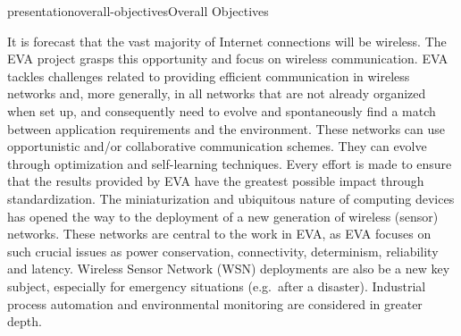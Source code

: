 \documentclass{ra2016}
\begin{document}


%

\begin{module}{presentation}{overall-objectives}{Overall Objectives}

It is forecast that the vast majority of Internet connections will be wireless.
The EVA project grasps this opportunity and focus on wireless communication.
EVA tackles challenges related to providing efficient communication in wireless networks and, more generally, in all networks that are not already organized when set up, and consequently need to evolve and spontaneously find a match between application requirements and the environment.
These networks can use opportunistic and/or collaborative communication schemes.
They can evolve through optimization and self-learning techniques.
Every effort is made to ensure that the results provided by EVA have the greatest possible impact through standardization.
The miniaturization and ubiquitous nature of computing devices has opened the way to the deployment of a new generation of wireless (sensor) networks.
These networks are central to the work in EVA, as EVA focuses on such crucial issues as power conservation, connectivity, determinism, reliability and latency.
Wireless Sensor Network (WSN) deployments are also be a new key subject, especially for emergency situations (e.g.~after a disaster).
Industrial process automation and environmental monitoring are considered in greater depth.

\end{module}

\end{document}
